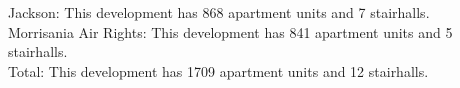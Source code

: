 {Jackson}: This development has 868 apartment units and 7 stairhalls.\\{Morrisania Air Rights}: This development has 841 apartment units and 5 stairhalls.\\{Total}: This development has 1709 apartment units and 12 stairhalls.\\